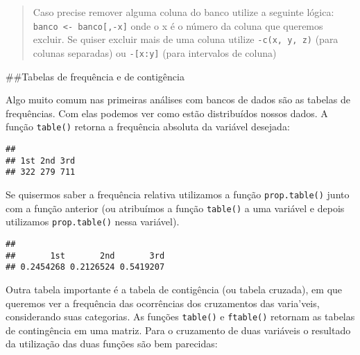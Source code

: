 \documentclass[]{book}
\newenvironment{Shaded}{\begin{snugshade}}{\end{snugshade}}
\newcommand{\KeywordTok}[1]{\textcolor[rgb]{0.13,0.29,0.53}{\textbf{#1}}}
\newcommand{\NormalTok}[1]{#1}
\newcommand{\OperatorTok}[1]{\textcolor[rgb]{0.81,0.36,0.00}{\textbf{#1}}}
\newcommand{\StringTok}[1]{\textcolor[rgb]{0.31,0.60,0.02}{#1}}
\theoremstyle{definition}
\theoremstyle{definition}
\theoremstyle{definition}
\theoremstyle{remark}
\begin{document}
\begin{quote}
Caso precise remover alguma coluna do banco utilize a seguinte lógica: \texttt{banco\ \textless{}-\ banco{[},-x{]}} onde o x é o número da coluna que queremos excluir. Se quiser excluir mais de uma coluna utilize \texttt{-c(x,\ y,\ z)} (para colunas separadas) ou \texttt{-{[}x:y{]}} (para intervalos de coluna)
\end{quote}

\#\#Tabelas de frequência e de contigência

Algo muito comum nas primeiras análises com bancos de dados são as tabelas de frequências. Com elas podemos ver como estão distribuídos nossos dados. A função \texttt{table()} retorna a frequência absoluta da variável desejada:

\begin{Shaded}
\end{Shaded}

\begin{verbatim}
## 
## 1st 2nd 3rd 
## 322 279 711
\end{verbatim}

Se quisermos saber a frequência relativa utilizamos a função \texttt{prop.table()} junto com a função anterior (ou atribuímos a função \texttt{table()} a uma variável e depois utilizamos \texttt{prop.table()} nessa variável).

\begin{Shaded}
\end{Shaded}

\begin{verbatim}
## 
##       1st       2nd       3rd 
## 0.2454268 0.2126524 0.5419207
\end{verbatim}

Outra tabela importante é a tabela de contigência (ou tabela cruzada), em que queremos ver a frequência das ocorrências dos cruzamentos das varia'veis, considerando suas categorias. As funções \texttt{table()} e \texttt{ftable()} retornam as tabelas de contingência em uma matriz. Para o cruzamento de duas variáveis o resultado da utilização das duas funções são bem parecidas:
\end{document}
